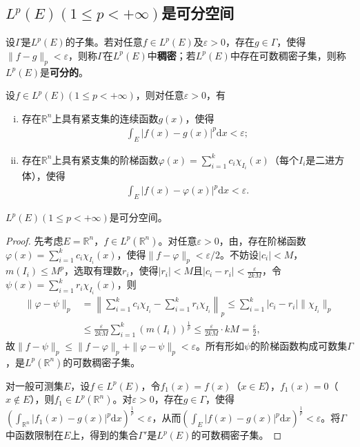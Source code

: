\documentclass[../../main.tex]{subfiles}%
\begin{document}
\subsection{$L^p(E)(1\leqslant p<+\infty)$是可分空间}

\begin{definition}
设$\Gamma$是$L^p(E)$的子集。若对任意$f\in L^p(E)$及$\varepsilon>0$，存在$g\in\Gamma$，使得$\|f-g\|_p<\varepsilon$，则称$\Gamma$在$L^p(E)$中\textbf{稠密}；若$L^p(E)$中存在可数稠密子集，则称$L^p(E)$是\textbf{可分的}。
\end{definition}

\begin{lemma}\label{lemma:实变函数--紧支集连续函数逼近Lp}
设$f\in L^p(E)(1\leqslant p<+\infty)$，则对任意$\varepsilon>0$，有
\begin{enumerate}[(i)]
\item 存在$\mathbb{R}^n$上具有紧支集的连续函数$g(x)$，使得
\begin{align*}
\int_E|f(x)-g(x)|^p\mathrm{d}x<\varepsilon;
\end{align*}
\item 存在$\mathbb{R}^n$上具有紧支集的阶梯函数$\varphi(x)=\sum\limits_{i=1}^k c_i\chi_{I_i}(x)$（每个$I_i$是二进方体），使得
\begin{align*}
\int_E|f(x)-\varphi(x)|^p\mathrm{d}x<\varepsilon.
\end{align*}
\end{enumerate}
\end{lemma}

\begin{theorem}
$L^p(E)(1\leqslant p<+\infty)$是可分空间。
\end{theorem}
\begin{proof}

先考虑$E=\mathbb{R}^n$，$f\in L^p(\mathbb{R}^n)$。对任意$\varepsilon>0$，由，存在阶梯函数$\varphi(x)=\sum\limits_{i=1}^k c_i\chi_{I_i}(x)$，使得$\|f-\varphi\|_p<\varepsilon/2$。不妨设$|c_i|<M$，$m(I_i)\leqslant M^p$，选取有理数$r_i$，使得$|r_i|<M$且$|c_i-r_i|<\frac{\varepsilon}{2kM}$，令$\psi(x)=\sum\limits_{i=1}^k r_i\chi_{I_i}(x)$，则
\begin{align*}
\|\varphi-\psi\|_p&=\left\|\sum\limits_{i=1}^k c_i\chi_{I_i}-\sum\limits_{i=1}^k r_i\chi_{I_i}\right\|_p
\leqslant\sum\limits_{i=1}^k |c_i-r_i|\|\chi_{I_i}\|_p\\
&\leqslant\frac{\varepsilon}{2kM}\sum\limits_{i=1}^k (m(I_i))^{\frac{1}{p}}\leqslant\frac{\varepsilon}{2kM}\cdot kM=\frac{\varepsilon}{2},
\end{align*}
故$\|f-\psi\|_p\leqslant\|f-\varphi\|_p+\|\varphi-\psi\|_p<\varepsilon$。所有形如$\psi$的阶梯函数构成可数集$\Gamma$，是$L^p(\mathbb{R}^n)$的可数稠密子集。

对一般可测集$E$，设$f\in L^p(E)$，令$f_1(x)=f(x)$（$x\in E$），$f_1(x)=0$（$x\notin E$），则$f_1\in L^p(\mathbb{R}^n)$。对$\varepsilon>0$，存在$g\in\Gamma$，使得$\left(\int_{\mathbb{R}^n}|f_1(x)-g(x)|^p\mathrm{d}x\right)^{\frac{1}{p}}<\varepsilon$，从而$\left(\int_E|f(x)-g(x)|^p\mathrm{d}x\right)^{\frac{1}{p}}<\varepsilon$。将$\Gamma$中函数限制在$E$上，得到的集合$\Gamma'$是$L^p(E)$的可数稠密子集。

\end{proof}
\end{document}
